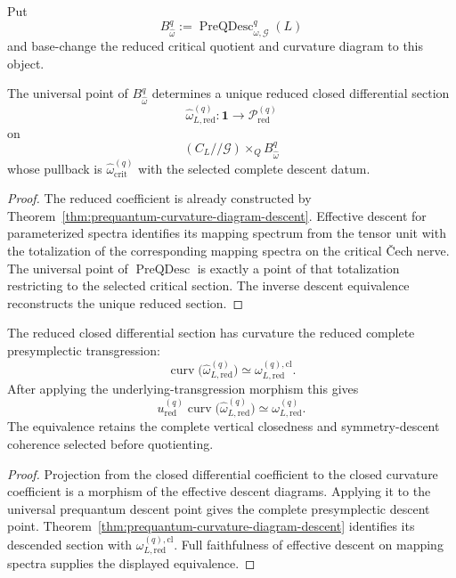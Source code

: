 Put
\[
B_{\widehat\omega}^q
:=
\operatorname{PreQDesc}_{\omega,\mathcal G}^{q}(L)
\]
and base-change the reduced critical quotient and curvature diagram to this object.

\begin{theorem}
\label{thm:prequantum-effective-differential-descent-pair}
The universal point of $B_{\widehat\omega}^q$ determines a unique reduced closed
differential section
\[
\boxed{
\widehat\omega_{L,\mathrm{red}}^{(q)}:
\mathbf1
\longrightarrow
\mathscr P_{\mathrm{red}}^{(q)}
}
\]
on
\[
(C_L//\mathcal G)\times_QB_{\widehat\omega}^q
\]
whose pullback is
$\widehat\omega_{\mathrm{crit}}^{(q)}$ with the selected complete descent datum.
\end{theorem}

\begin{proof}
The reduced coefficient is already constructed by
Theorem~\ref{thm:prequantum-curvature-diagram-descent}.  Effective descent for
parameterized spectra identifies its mapping spectrum from the tensor unit with
the totalization of the corresponding mapping spectra on the critical \v{C}ech
nerve.  The universal point of $\operatorname{PreQDesc}$ is exactly a point of
that totalization restricting to the selected critical section.  The inverse
descent equivalence reconstructs the unique reduced section.
\end{proof}

\begin{theorem}
\label{thm:prequantum-curvature-reduced-prequantization}
The reduced closed differential section has curvature the reduced complete
presymplectic transgression:
\[
\boxed{
\operatorname{curv}
\bigl(\widehat\omega_{L,\mathrm{red}}^{(q)}\bigr)
\simeq
\omega_{L,\mathrm{red}}^{(q),\mathrm{cl}}.
}
\]
After applying the underlying-transgression morphism this gives
\[
\boxed{
 u_{\mathrm{red}}^{(q)}
\operatorname{curv}
\bigl(\widehat\omega_{L,\mathrm{red}}^{(q)}\bigr)
\simeq
\omega_{L,\mathrm{red}}^{(q)}.
}
\]
The equivalence retains the complete vertical closedness and symmetry-descent
coherence selected before quotienting.
\end{theorem}

\begin{proof}
Projection from the closed differential coefficient to the closed curvature
coefficient is a morphism of the effective descent diagrams.  Applying it to the
universal prequantum descent point gives the complete presymplectic descent point.
Theorem~\ref{thm:prequantum-curvature-diagram-descent} identifies its descended
section with $\omega_{L,\mathrm{red}}^{(q),\mathrm{cl}}$.  Full faithfulness of
effective descent on mapping spectra supplies the displayed equivalence.
\end{proof}

